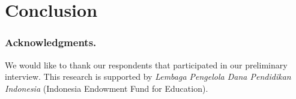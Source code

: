 \documentclass[runningheads,a4paper]{llncs}
\begin{document}
\section{Conclusion}
 

\subsubsection*{Acknowledgments.} We would like to thank our respondents that participated in our preliminary interview. This research is supported by \emph{Lembaga Pengelola Dana Pendidikan Indonesia} (Indonesia Endowment Fund for Education). 

 

\end{document}
